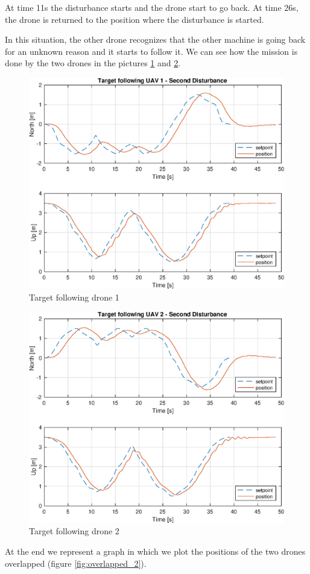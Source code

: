At time 11s the disturbance starts and the drone start to go back. At time 26s,
the drone is returned to the position where the disturbance is started.

In this situation, the other drone recognizes that the other machine is going back
for an unknown reason and it starts to follow it. We can see how the mission is done
by the two drones in the pictures \ref{fig:following_1_2} and \ref{fig:following_2_2}.

\begin{figure}
\centering
\includegraphics[width=0.7\linewidth]{chapters/chapter-04/figures/following_1_2.eps}
\caption{Target following drone 1}
\label{fig:following_1_2}
\end{figure}

\begin{figure}
\centering
\includegraphics[width=0.7\linewidth]{chapters/chapter-04/figures/following_2_2.eps}
\caption{Target following drone 2}
\label{fig:following_2_2}
\end{figure}

At the end we represent a graph in which we plot the positions of the two drones overlapped
(figure \ref{fig:overlapped_2}).

